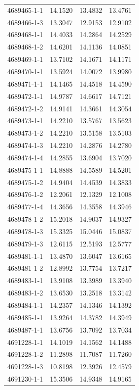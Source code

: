 \begin{longtable}{lrrr}
4689465-1-1 & 14.1520 & 13.4832 & 13.4761 \\
4689466-1-3 & 13.3047 & 12.9153 & 12.9102 \\
4689468-1-1 & 14.4033 & 14.2864 & 14.2529 \\
4689468-1-2 & 14.6201 & 14.1136 & 14.0851 \\
4689469-1-1 & 13.7102 & 14.1671 & 14.1171 \\
4689470-1-1 & 13.5924 & 14.0072 & 13.9980 \\
4689471-1-1 & 14.1465 & 14.4518 & 14.4590 \\
4689472-1-1 & 14.9787 & 14.6617 & 14.7121 \\
4689472-1-2 & 14.9141 & 14.3661 & 14.3054 \\
4689473-1-1 & 14.2210 & 13.5767 & 13.5623 \\
4689473-1-2 & 14.2210 & 13.5158 & 13.5103 \\
4689474-1-3 & 14.2210 & 14.2876 & 14.2780 \\
4689474-1-4 & 14.2855 & 13.6904 & 13.7020 \\
4689475-1-1 & 14.8888 & 14.5589 & 14.5201 \\
4689475-1-2 & 14.9404 & 14.4539 & 14.3833 \\
4689476-1-2 & 12.2061 & 12.1329 & 12.1008 \\
4689477-1-4 & 14.3656 & 14.3558 & 14.3946 \\
4689478-1-2 & 15.2018 & 14.9037 & 14.9327 \\
4689478-1-3 & 15.3325 & 15.0446 & 15.0837 \\
4689479-1-3 & 12.6115 & 12.5193 & 12.5777 \\
4689481-1-1 & 13.4870 & 13.6047 & 13.6165 \\
4689481-1-2 & 12.8992 & 13.7754 & 13.7217 \\
4689483-1-1 & 13.9108 & 13.3989 & 13.3940 \\
4689483-1-2 & 13.6530 & 13.2518 & 13.3142 \\
4689484-1-1 & 14.2357 & 14.1346 & 14.1392 \\
4689485-1-1 & 13.9264 & 14.3782 & 14.3949 \\
4689487-1-1 & 13.6756 & 13.7092 & 13.7034 \\
4691228-1-1 & 14.1019 & 14.1562 & 14.1488 \\
4691228-1-2 & 11.2898 & 11.7087 & 11.7260 \\
4691228-1-3 & 10.8198 & 12.3926 & 12.4579 \\
4691230-1-1 & 15.3506 & 14.9348 & 14.9165 \\

\end{longtable}
